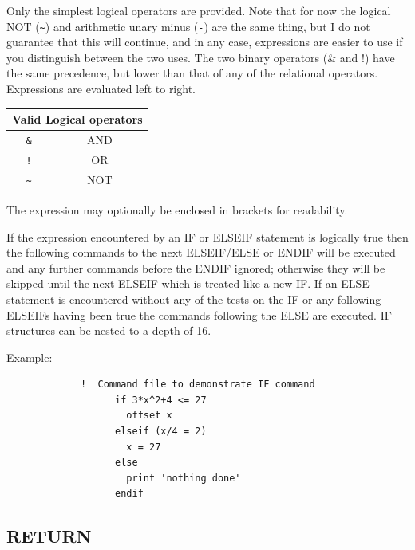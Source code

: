 \documentclass[11pt,twoside]{report}
\begin{document}
Only the simplest logical operators are provided. Note that for now the
logical NOT (\verb+~+) and arithmetic unary
minus (\verb+-+) are the same thing, but I do not guarantee
that this will continue, and in any case, expressions are easier to use if you
distinguish between the two uses. The two binary operators (\& and !) have the same precedence, but
lower than that of any of the relational operators. Expressions are evaluated
left to right.

\begin{center}
\begin{tabular}{|cc|} \hline
               \multicolumn{2}{|c|}{Valid Logical operators} \\ \hline
               \verb$&$          & AND \\
               \verb$!$          & OR \\
               \verb$~$          & NOT \\ \hline
\end{tabular}
\end{center}

The expression may optionally be enclosed in brackets for readability.

If the expression encountered by an IF or ELSEIF statement is logically true
then the following commands to the next ELSEIF/ELSE or ENDIF will be executed
and any further commands before the ENDIF ignored; otherwise they will be
skipped until the next ELSEIF which is treated like a new IF. If an ELSE
statement is encountered without any of the tests on the IF or any following
ELSEIFs having been true the commands following the ELSE are executed. IF
structures can be nested to a depth of 16.

Example: 
\begin{verbatim}
             !  Command file to demonstrate IF command
                   if 3*x^2+4 <= 27
                     offset x
                   elseif (x/4 = 2)
                     x = 27
                   else
                     print 'nothing done'
                   endif
\end{verbatim}

\subsection{RETURN}
\end{document}
